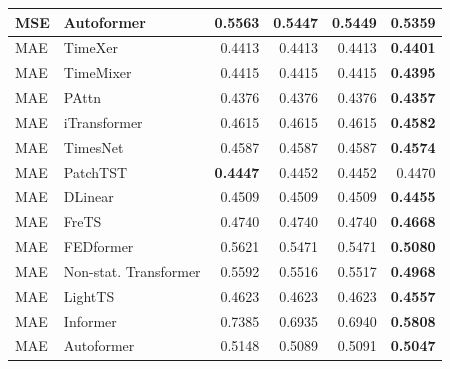 \begin{longtable}{llrrrr}
MSE & Autoformer & 0.5563 & 0.5447 & 0.5449 & \textbf{0.5359} \\
\midrule
MAE & TimeXer & 0.4413 & 0.4413 & 0.4413 & \textbf{0.4401} \\
MAE & TimeMixer & 0.4415 & 0.4415 & 0.4415 & \textbf{0.4395} \\
MAE & PAttn & 0.4376 & 0.4376 & 0.4376 & \textbf{0.4357} \\
MAE & iTransformer & 0.4615 & 0.4615 & 0.4615 & \textbf{0.4582} \\
MAE & TimesNet & 0.4587 & 0.4587 & 0.4587 & \textbf{0.4574} \\
MAE & PatchTST & \textbf{0.4447} & 0.4452 & 0.4452 & 0.4470 \\
MAE & DLinear & 0.4509 & 0.4509 & 0.4509 & \textbf{0.4455} \\
MAE & FreTS & 0.4740 & 0.4740 & 0.4740 & \textbf{0.4668} \\
MAE & FEDformer & 0.5621 & 0.5471 & 0.5471 & \textbf{0.5080} \\
MAE & Non-stat. Transformer & 0.5592 & 0.5516 & 0.5517 & \textbf{0.4968} \\
MAE & LightTS & 0.4623 & 0.4623 & 0.4623 & \textbf{0.4557} \\
MAE & Informer & 0.7385 & 0.6935 & 0.6940 & \textbf{0.5808} \\
MAE & Autoformer & 0.5148 & 0.5089 & 0.5091 & \textbf{0.5047} \\
\end{longtable}
\endgroup

